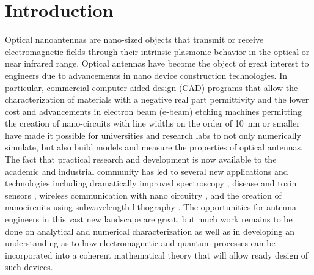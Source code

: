 \documentclass[11pt]{article}
\begin{document}
\section{Introduction}
%
Optical nanoantennas are nano-sized objects that transmit or receive electromagnetic fields through their intrinsic plasmonic behavior in the optical or near infrared range. Optical antennas have become the object of great interest to engineers due to advancements in nano device construction technologies. In particular, commercial computer aided design (CAD) programs that allow the characterization of materials with a negative real part permittivity and the lower cost and advancements in electron beam (e-beam) etching machines permitting the creation of nano-circuits with line widths on the order of \SI{10}{\nano\metre} or smaller have made it possible for universities and research labs to not only numerically simulate, but also build models and measure the properties of optical antennas. The fact that practical research and development is now available to the academic and industrial community has led to several new applications and technologies including dramatically improved spectroscopy
\cite{Ouyang1992,Nie1997, Kneipp1997}, disease and toxin sensors \cite{Arduini2010, Nevels2012}, wireless communication with nano circuitry \cite{Adato2011}, and the creation of nanocircuits using subwavelength lithography \cite{Torres2003, Ishihara2006}. The opportunities for antenna engineers in this vast new landscape are great, but much work remains to be done on analytical and numerical characterization as well as in developing an understanding as to how electromagnetic and quantum processes can be incorporated into a coherent mathematical theory that will allow ready design of such devices.
\end{document}
